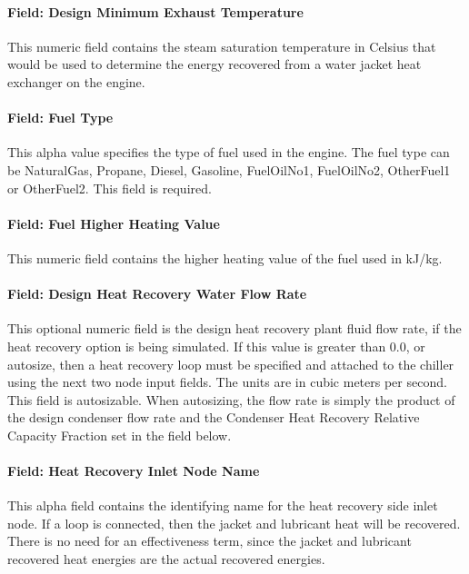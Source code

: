 \paragraph{Field: Design Minimum Exhaust Temperature}\label{field-design-minimum-exhaust-temperature-000}

This numeric field contains the steam saturation temperature in Celsius that would be used to determine the energy recovered from a water jacket heat exchanger on the engine.

\paragraph{Field: Fuel Type}\label{field-fuel-type-002}

This alpha value specifies the type of fuel used in the engine. The fuel type can be NaturalGas, Propane, Diesel, Gasoline, FuelOilNo1, FuelOilNo2, OtherFuel1 or OtherFuel2. This field is required.

\paragraph{Field: Fuel Higher Heating Value}\label{field-fuel-higher-heating-value-000}

This numeric field contains the higher heating value of the fuel used in kJ/kg.

\paragraph{Field: Design Heat Recovery Water Flow Rate}\label{field-design-heat-recovery-water-flow-rate-3}

This optional numeric field is the design heat recovery plant fluid flow rate, if the heat recovery option is being simulated. If this value is greater than 0.0, or autosize, then a heat recovery loop must be specified and attached to the chiller using the next two node input fields. The units are in cubic meters per second.  This field is autosizable. When autosizing, the flow rate is simply the product of the design condenser flow rate and the Condenser Heat Recovery Relative Capacity Fraction set in the field below.

\paragraph{Field: Heat Recovery Inlet Node Name}\label{field-heat-recovery-inlet-node-name-3}

This alpha field contains the identifying name for the heat recovery side inlet node. If a loop is connected, then the jacket and lubricant heat will be recovered. There is no need for an effectiveness term, since the jacket and lubricant recovered heat energies are the actual recovered energies.

